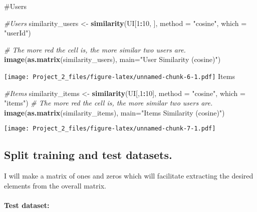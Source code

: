 \documentclass[]{article}
\newenvironment{Shaded}{\begin{snugshade}}{\end{snugshade}}
\newcommand{\CommentTok}[1]{\textcolor[rgb]{0.56,0.35,0.01}{\textit{#1}}}
\newcommand{\DataTypeTok}[1]{\textcolor[rgb]{0.13,0.29,0.53}{#1}}
\newcommand{\DecValTok}[1]{\textcolor[rgb]{0.00,0.00,0.81}{#1}}
\newcommand{\KeywordTok}[1]{\textcolor[rgb]{0.13,0.29,0.53}{\textbf{#1}}}
\newcommand{\NormalTok}[1]{#1}
\newcommand{\OperatorTok}[1]{\textcolor[rgb]{0.81,0.36,0.00}{\textbf{#1}}}
\newcommand{\StringTok}[1]{\textcolor[rgb]{0.31,0.60,0.02}{#1}}
\let\oldparagraph\paragraph
\renewcommand{\paragraph}[1]{\oldparagraph{#1}\mbox{}}
\begin{document}
\#Users

\begin{Shaded}
\begin{Highlighting}[]
\CommentTok{#Users}
\NormalTok{similarity_users <-}\StringTok{ }\KeywordTok{similarity}\NormalTok{(UI[}\DecValTok{1}\OperatorTok{:}\DecValTok{10}\NormalTok{, ], }\DataTypeTok{method =} \StringTok{"cosine"}\NormalTok{, }\DataTypeTok{which =} \StringTok{"userId"}\NormalTok{)}

\CommentTok{# The more red the cell is, the more similar two users are. }
\KeywordTok{image}\NormalTok{(}\KeywordTok{as.matrix}\NormalTok{(similarity_users), }\DataTypeTok{main=}\StringTok{"User Similarity (cosine)"}\NormalTok{)}
\end{Highlighting}
\end{Shaded}

\texttt{[image: Project\_2\_files/figure-latex/unnamed-chunk-6-1.pdf]}
Items

\begin{Shaded}
\begin{Highlighting}[]
\CommentTok{#Items}
\NormalTok{similarity_items <-}\StringTok{ }\KeywordTok{similarity}\NormalTok{(UI[,}\DecValTok{1}\OperatorTok{:}\DecValTok{10}\NormalTok{], }\DataTypeTok{method =} \StringTok{"cosine"}\NormalTok{, }\DataTypeTok{which =} \StringTok{"items"}\NormalTok{)}
\CommentTok{# The more red the cell is, the more similar two users are. }
\KeywordTok{image}\NormalTok{(}\KeywordTok{as.matrix}\NormalTok{(similarity_items), }\DataTypeTok{main=}\StringTok{"Items Similarity (cosine)"}\NormalTok{)}
\end{Highlighting}
\end{Shaded}

\texttt{[image: Project\_2\_files/figure-latex/unnamed-chunk-7-1.pdf]}

\hypertarget{split-training-and-test-datasets.}{%
\subsection{Split training and test
datasets.}\label{split-training-and-test-datasets.}}

I will make a matrix of ones and zeros which will facilitate extracting
the desired elements from the overall matrix.

\hypertarget{test-dataset}{%
\paragraph{Test dataset:}\label{test-dataset}}
\end{document}
